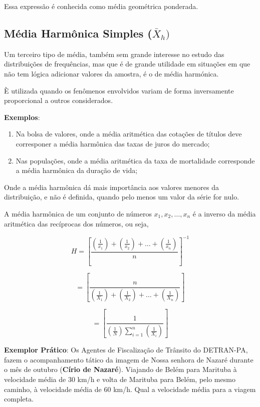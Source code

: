 Essa expressão é conhecida como média geométrica ponderada.



\subsection{Média Harmônica Simples ($\bar{X}_{h})$}


\inic Um terceiro tipo de média, também sem grande interesse no estudo das
distribuições de frequências, mas que é de grande utilidade em situações em que não
tem lógica adicionar valores da amostra, é o de média harmónica.\vskip0.3cm



È utilizada quando os fenômenos envolvidos variam de forma inversamente proporcional a outros considerados.\vskip0.3cm

\textbf{Exemplos}:
\begin{enumerate}
  \item Na bolsa de valores, onde a média aritmética das cotações de títulos deve corresponer a média harmônica das taxas de juros do mercado;
  \item Nas populações, onde a média aritmética da taxa de mortalidade corresponde a média harmônica da duração de vida;
\end{enumerate}

Onde a média harmônica dá mais importância aos valores menores da distribuição, e não é definida, quando pelo menos um valor da série for nulo.\vskip0.3cm


A média harmônica de um conjunto de números $x_{1},x_{2},\ldots,x_{n}$ é a inverso da média
aritmética das recíprocas dos números, ou seja,


\begin{equation}\label{harmonica1}
H= \left[ \frac{  (\frac{1}{x_{1}})+(\frac{1}{x_{2}})+\ldots+(\frac{1}{x_{n}})  }{n} \right ]  ^{-1} 
\end{equation}

\begin{equation*}\label{harmonica1}
 =\left[  \frac{n}{(\frac{1}{X_{1}})+(\frac{1}{X_{2}})+\ldots+(\frac{1}{X_{n}})}  \right ]
\end{equation*}

\begin{equation*}\label{harmonica}
=\left[  \frac{1}{ (\frac{1}{N}) \sum_{i=1}^{n} (\frac{1}{X_{i}}) } \right ]
\end{equation*}


\newpage
\textbf{Exemplor Prático}: Os Agentes de Fiscalização de Trânsito do DETRAN-PA, fazem o acompanhamento tático da imagem de Nossa senhora de Nazaré durante o mês de outubro (\textbf{Círio de Nazaré}). Viajando de Belém para Marituba à velocidade média de 30 km/h e volta de Marituba para Belém, pelo mesmo caminho, à velocidade média de 60 km/h. Qual a velocidade média para a viagem completa.


